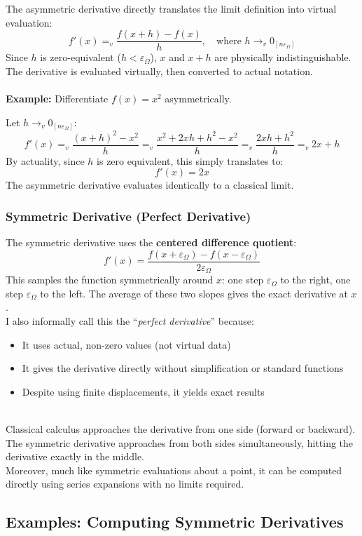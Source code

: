 \documentclass{article}
\begin{document}
The asymmetric derivative directly translates the limit definition into virtual evaluation:
$$f'(x) =_v \frac{f(x + h) - f(x)}{h}, \quad \text{where } h \to_v 0_{[n\varepsilon_\Omega]}$$ Since $h$ is zero-equivalent ($h < \varepsilon_\Omega$), $x$ and $x + h$ are physically indistinguishable. The derivative is evaluated virtually, then converted to actual notation.\\\\\textbf{Example:} Differentiate $f(x) = x^2$ asymmetrically.

Let $h \to_v 0_{[n\varepsilon_\Omega]}$:
$$f'(x) =_v \frac{(x + h)^2 - x^2}{h} =_v \frac{x^2 + 2xh + h^2 - x^2}{h} =_v \frac{2xh + h^2}{h} =_v 2x + h$$By actuality, since $h$ is zero equivalent, this simply translates to:
$$f'(x) = 2x$$The asymmetric derivative evaluates identically to a classical limit.

\subsubsection{Symmetric Derivative (Perfect Derivative)}

The symmetric derivative uses the \textbf{centered difference quotient}:
$$f'(x) = \frac{f(x + \varepsilon_\Omega) - f(x - \varepsilon_\Omega)}{2\varepsilon_\Omega}$$This samples the function symmetrically around $x$: one step $\varepsilon_\Omega$ to the right, one step $\varepsilon_\Omega$ to the left. The average of these two slopes gives the exact derivative at $x$.\\I also informally call this the ``\textit{perfect derivative}'' because:
\begin{itemize}
\item It uses actual, non-zero values (not virtual data)
\item It gives the derivative directly without simplification or standard functions
\item Despite using finite displacements, it yields exact results
\end{itemize}
\\Classical calculus approaches the derivative from one side (forward or backward). The symmetric derivative approaches from both sides simultaneously, hitting the derivative exactly in the middle.\\Moreover, much like symmetric evaluations about a point, it can be computed directly using series expansions with no limits required.

\subsection{Examples: Computing Symmetric Derivatives}
\end{document}
